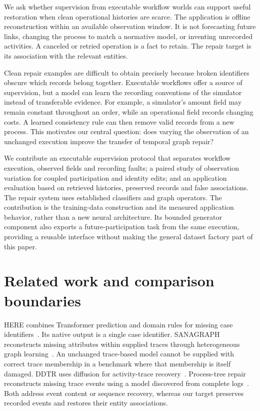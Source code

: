 \documentclass[11pt]{article}
\begin{document}
We ask whether supervision from executable workflow worlds can support useful restoration when clean operational histories are scarce. The application is offline reconstruction within an available observation window. It is not forecasting future links, changing the process to match a normative model, or inventing unrecorded activities. A canceled or retried operation is a fact to retain. The repair target is its association with the relevant entities.

Clean repair examples are difficult to obtain precisely because broken identifiers obscure which records belong together. Executable workflows offer a source of supervision, but a model can learn the recording conventions of the simulator instead of transferable evidence. For example, a simulator's amount field may remain constant throughout an order, while an operational field records changing costs. A learned consistency rule can then remove valid records from a new process. This motivates our central question: does varying the observation of an unchanged execution improve the transfer of temporal graph repair?

We contribute an executable supervision protocol that separates workflow execution, observed fields and recording faults; a paired study of observation variation for coupled participation and identity edits; and an application evaluation based on retrieved histories, preserved records and false associations. The repair system uses established classifiers and graph operators. The contribution is the training-data construction and its measured application behavior, rather than a new neural architecture. Its bounded generator component also exports a future-participation task from the same execution, providing a reusable interface without making the general dataset factory part of this paper.

\section{Related work and comparison boundaries}
HERE combines Transformer prediction and domain rules for missing case identifiers~\cite{here}. Its native output is a single case identifier. SANAGRAPH reconstructs missing attributes within supplied traces through heterogeneous graph learning~\cite{sanagraph}. An unchanged trace-based model cannot be supplied with correct trace membership in a benchmark where that membership is itself damaged. DDTR uses diffusion for activity-trace recovery~\cite{ddtr}. Process-tree repair reconstructs missing trace events using a model discovered from complete logs~\cite{processtree}. Both address event content or sequence recovery, whereas our target preserves recorded events and restores their entity associations.
\end{document}
